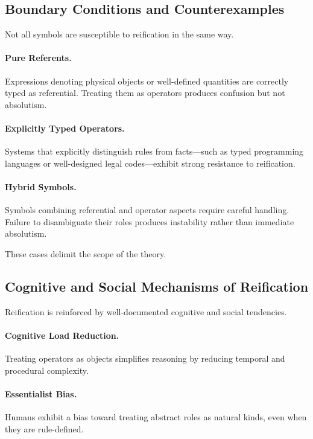 \documentclass[11pt]{article}
\begin{document}
\subsection{Boundary Conditions and Counterexamples}

Not all symbols are susceptible to reification in the same way.

\paragraph{Pure Referents.}
Expressions denoting physical objects or well-defined quantities are correctly
typed as referential. Treating them as operators produces confusion but not
absolutism.

\paragraph{Explicitly Typed Operators.}
Systems that explicitly distinguish rules from facts—such as typed programming
languages or well-designed legal codes—exhibit strong resistance to reification.

\paragraph{Hybrid Symbols.}
Symbols combining referential and operator aspects require careful handling.
Failure to disambiguate their roles produces instability rather than immediate
absolutism.

These cases delimit the scope of the theory.

\subsection{Cognitive and Social Mechanisms of Reification}

Reification is reinforced by well-documented cognitive and social tendencies.

\paragraph{Cognitive Load Reduction.}
Treating operators as objects simplifies reasoning by reducing temporal and
procedural complexity.

\paragraph{Essentialist Bias.}
Humans exhibit a bias toward treating abstract roles as natural kinds, even when
they are rule-defined.
\end{document}
